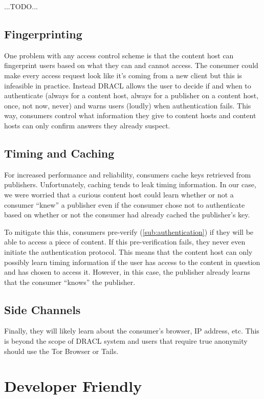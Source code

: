 \documentclass[pdftex,12pt,a4papaer]{report}
\begin{document}
...TODO...

\subsection{Fingerprinting}
\label{sub:fingerprinting}

One problem with any access control scheme is that the content host can
fingerprint users based on what they can and cannot access. The consumer could
make every access request look like it's coming from a new client but this is
infeasible in practice. Instead DRACL allows the user to decide if and when to
authenticate (always for a content host, always for a publisher on a content
host, once, not now, never) and warns users (loudly) when authentication fails.
This way, consumers control what information they give to content hosts and
content hosts can only confirm answers they already suspect.

\subsection{Timing and Caching}

For increased performance and reliability, consumers cache keys retrieved from
publishers. Unfortunately, caching tends to leak timing information. In our
case, we were worried that a curious content host could learn whether or not a
consumer ``knew'' a publisher even if the consumer chose not to authenticate
based on whether or not the consumer had already cached the publisher's key.

To mitigate this this, consumers pre-verify (\ref{sub:authentication}) if they
will be able to access a piece of content. If this pre-verification fails, they
never even initiate the authentication protocol. This means that the content
host can only possibly learn timing information if the user has access to the
content in question and has chosen to access it. However, in this case, the
publisher already learns that the consumer ``knows'' the publisher.

\subsection{Side Channels}

Finally, they will likely learn about the consumer's browser, IP address, etc.
This is beyond the scope of DRACL system and users that require true anonymity
should use the Tor Browser\cite{tor} or Tails\cite{tails}.

\section{Developer Friendly}
\end{document}
